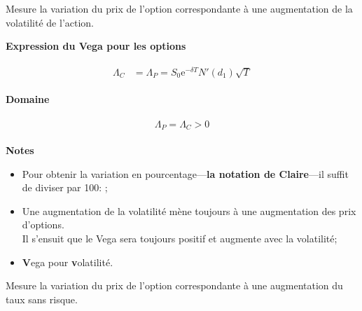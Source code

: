 \documentclass[10pt, french]{article}
\begin{document}
\begin{multicols*}{2}
\begin{definitionNOHFILL}[Vega alias Lambda $\Lambda	=	\deriv{\sigma}{V}$]
Mesure la variation du prix de l'option correspondante à une augmentation de la volatilité de l'action.
\tcbline

\begin{minipage}[ht]{0.5\linewidth}
\begin{center}
	\textbf{Expression du Vega pour les options}
\end{center}
\begin{gather}
\begin{align*}
	\Lambda_{C}
	&=	\Lambda_{P}
	=	S_{0} \textrm{e}^{-\delta T} N'(d_{1}) \sqrt{T}
\end{align*}
\end{gather}
\end{minipage}
\begin{minipage}[ht]{0.5\linewidth}
\begin{center}
	\textbf{Domaine}
\end{center}
\begin{gather}
\begin{align*}
	\Lambda_{P}	=	\Lambda_{C}	>	0
\end{align*}
\end{gather}
\end{minipage}

\tcbline

\begin{center}
	\textbf{Notes}
\end{center}
\begin{itemize}[leftmargin = *]
	\item	Pour obtenir la variation en pourcentage---\textbf{la notation de Claire}---il suffit de diviser par 100: ;
	\item	Une augmentation de la volatilité mène toujours à une augmentation des prix d'options.\\
			Il s'ensuit que le Vega sera toujours positif et augmente avec la volatilité;
	\item	\textbf{V}ega pour \textbf{v}olatilité.
\end{itemize}
\end{definitionNOHFILL}

\begin{definitionNOHFILL}[Rho $\rho	=	\deriv{r}{V}$]
Mesure la variation du prix de l'option correspondante à une augmentation du taux sans risque.

\tcbline


\end{definitionNOHFILL}
\end{multicols*}
\end{document}

